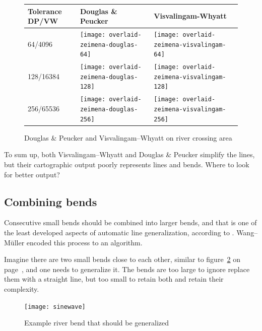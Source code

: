 \documentclass[a4paper]{article}
\newcommand{\DP}{Douglas \& Peucker}
\newcommand{\VW}{Visvalingam--Whyatt}
\newcommand{\WM}{Wang--M{\"u}ller}
\begin{document}
\begin{figure}[h]
    \renewcommand{\tabularxcolumn}[1]{>{\center\small}m{#1}}
    \begin{tabularx}{\textwidth}{ p{2.1cm} | X | X | }
        Tolerance DP/VW                                                      &
        Douglas \& Peucker                                                   &
        Visvalingam-Whyatt                                                   \tabularnewline \hline

        64/4096                                                              &
        \texttt{[image: overlaid-zeimena-douglas-64]}      &
        \texttt{[image: overlaid-zeimena-visvalingam-64]}  \tabularnewline \hline

        128/16384                                                            &
        \texttt{[image: overlaid-zeimena-douglas-128]}     &
        \texttt{[image: overlaid-zeimena-visvalingam-128]} \tabularnewline \hline

        256/65536                                                            &
        \texttt{[image: overlaid-zeimena-douglas-256]}     &
        \texttt{[image: overlaid-zeimena-visvalingam-256]} \tabularnewline \hline

    \end{tabularx}
    \caption{{\DP} and {\VW} on river crossing area}
    \label{tab:comparison-crossing}
\end{figure}


To sum up, both {\VW} and {\DP} simplify the lines, but their cartographic
output poorly represents lines and bends. Where to look for better output?

\subsection{Combining bends}

Consecutive small bends should be combined into larger bends, and that is one
of the least developed aspects of automatic line generalization, according to
\cite{miuller1995generalization}. {\WM} encoded this process to an algorithm.

Imagine there are two small bends close to each other, similar to
figure~\ref{pic:sinewave} on page~\pageref{pic:sinewave}, and one needs
to generalize it. The bends are too large to ignore replace them with a
straight line, but too small to retain both and retain their complexity.

\begin{figure}[h]
    \centering
    \texttt{[image: sinewave]}
    \caption{Example river bend that should be generalized}
    \label{pic:sinewave}
\end{figure}
\end{document}

